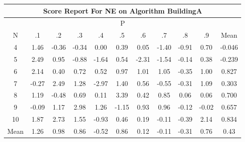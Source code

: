 \documentclass[11pt,a4paper]{report}
\begin{document}
\begin{longtable}{ | c || c | c | c | c | c | c | c | c | c || c |}
\hline
\multicolumn{11}{|c|}{ Score Report For NE on Algorithm BuildingA} \\
\hline
\multicolumn{11}{|c|}{ P } \\
\hline
N & .1 & .2 & .3 & .4 & .5 & .6 & .7 & .8 & .9 & Mean\\
 \hline
 \hline
 \endhead
  4 &  \cellcolor[HTML]{D7D7FF} 1.46 &  \cellcolor[HTML]{FFF7F7} -0.36 &  \cellcolor[HTML]{FFF7F7} -0.34 &  \cellcolor[HTML]{FFFFFF} 0.00 &  \cellcolor[HTML]{F7F7FF} 0.39 &  \cellcolor[HTML]{FFFFFF} 0.05 &  \cellcolor[HTML]{FFDFDF} -1.40 &  \cellcolor[HTML]{FFE7E7} -0.91 &  \cellcolor[HTML]{EFEFFF} 0.70 & -0.046 \\
  5 &  \cellcolor[HTML]{BFBFFF} 2.49 &  \cellcolor[HTML]{E7E7FF} 0.95 &  \cellcolor[HTML]{FFE7E7} -0.88 &  \cellcolor[HTML]{FFD7D7} -1.64 &  \cellcolor[HTML]{EFEFFF} 0.54 &  \cellcolor[HTML]{FFC7C7} -2.31 &  \cellcolor[HTML]{FFD7D7} -1.54 &  \cellcolor[HTML]{FFFFFF} -0.14 &  \cellcolor[HTML]{F7F7FF} 0.38 & -0.239 \\
  6 &  \cellcolor[HTML]{C7C7FF} 2.14 &  \cellcolor[HTML]{F7F7FF} 0.40 &  \cellcolor[HTML]{EFEFFF} 0.72 &  \cellcolor[HTML]{EFEFFF} 0.52 &  \cellcolor[HTML]{E7E7FF} 0.97 &  \cellcolor[HTML]{E7E7FF} 1.01 &  \cellcolor[HTML]{E7E7FF} 1.05 &  \cellcolor[HTML]{FFF7F7} -0.35 &  \cellcolor[HTML]{E7E7FF} 1.00 & 0.827 \\
  7 &  \cellcolor[HTML]{FFF7F7} -0.27 &  \cellcolor[HTML]{BFBFFF} 2.49 &  \cellcolor[HTML]{DFDFFF} 1.28 &  \cellcolor[HTML]{FFB7B7} -2.97 &  \cellcolor[HTML]{DFDFFF} 1.40 &  \cellcolor[HTML]{EFEFFF} 0.56 &  \cellcolor[HTML]{FFEFEF} -0.55 &  \cellcolor[HTML]{FFF7F7} -0.31 &  \cellcolor[HTML]{E7E7FF} 1.09 & 0.303 \\
  8 &  \cellcolor[HTML]{DFDFFF} 1.19 &  \cellcolor[HTML]{FFEFEF} -0.48 &  \cellcolor[HTML]{EFEFFF} 0.69 &  \cellcolor[HTML]{FFFFFF} 0.11 &  \cellcolor[HTML]{A7A7FF} 3.39 &  \cellcolor[HTML]{F7F7FF} 0.42 &  \cellcolor[HTML]{E7E7FF} 0.85 &  \cellcolor[HTML]{FFFFFF} 0.06 &  \cellcolor[HTML]{FFFFFF} 0.06 & 0.700 \\
  9 &  \cellcolor[HTML]{FFFFFF} -0.09 &  \cellcolor[HTML]{DFDFFF} 1.17 &  \cellcolor[HTML]{B7B7FF} 2.98 &  \cellcolor[HTML]{DFDFFF} 1.26 &  \cellcolor[HTML]{FFDFDF} -1.15 &  \cellcolor[HTML]{E7E7FF} 0.93 &  \cellcolor[HTML]{E7E7FF} 0.96 &  \cellcolor[HTML]{FFFFFF} -0.12 &  \cellcolor[HTML]{FFFFFF} -0.02 & 0.657 \\
  10 &  \cellcolor[HTML]{CFCFFF} 1.87 &  \cellcolor[HTML]{B7B7FF} 2.73 &  \cellcolor[HTML]{D7D7FF} 1.55 &  \cellcolor[HTML]{FFE7E7} -0.93 &  \cellcolor[HTML]{F7F7FF} 0.46 &  \cellcolor[HTML]{F7F7FF} 0.19 &  \cellcolor[HTML]{FFFFFF} -0.11 &  \cellcolor[HTML]{FFF7F7} -0.39 &  \cellcolor[HTML]{C7C7FF} 2.14 & 0.834 \\
 \hline
 \hline
Mean &  \cellcolor[HTML]{DFDFFF} 1.26 &  \cellcolor[HTML]{E7E7FF} 0.98 &  \cellcolor[HTML]{E7E7FF} 0.86 &  \cellcolor[HTML]{FFEFEF} -0.52 &  \cellcolor[HTML]{E7E7FF} 0.86 &  \cellcolor[HTML]{FFFFFF} 0.12 &  \cellcolor[HTML]{FFFFFF} -0.11 &  \cellcolor[HTML]{FFF7F7} -0.31 &  \cellcolor[HTML]{EFEFFF} 0.76 &  \cellcolor[HTML]{F7F7FF} 0.43
\end{longtable}
\end{document}
